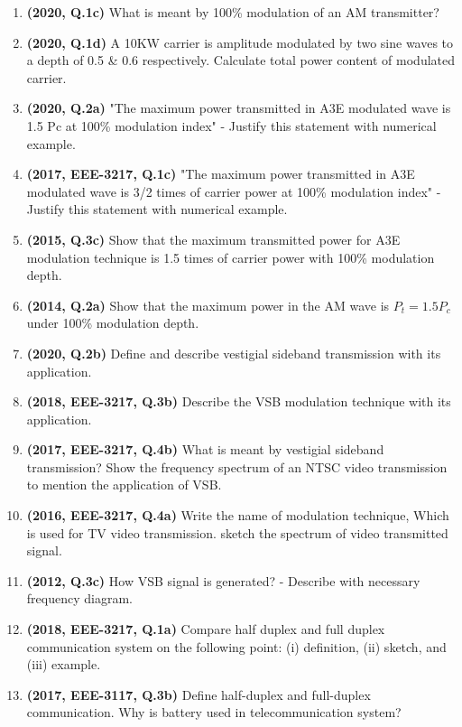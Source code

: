 \documentclass[12pt, a4paper]{article}
\begin{document}
\begin{enumerate}
		\item \textbf{(2020, Q.1c)} What is meant by 100\% modulation of an AM transmitter?
		
		\item \textbf{(2020, Q.1d)} A 10KW carrier is amplitude modulated by two sine waves to a depth of 0.5 \& 0.6 respectively. Calculate total power content of modulated carrier.
		
		\item \textbf{(2020, Q.2a)} "The maximum power transmitted in A3E modulated wave is 1.5 Pc at 100\% modulation index" - Justify this statement with numerical example.
		\item \textbf{(2017, EEE-3217, Q.1c)} "The maximum power transmitted in A3E modulated wave is 3/2 times of carrier power at 100\% modulation index" - Justify this statement with numerical example.
		\item \textbf{(2015, Q.3c)} Show that the maximum transmitted power for A3E modulation technique is 1.5 times of carrier power with 100\% modulation depth.
		\item \textbf{(2014, Q.2a)} Show that the maximum power in the AM wave is $P_t = 1.5 P_c$ under 100\% modulation depth.
		
		\item \textbf{(2020, Q.2b)} Define and describe vestigial sideband transmission with its application.
		\item \textbf{(2018, EEE-3217, Q.3b)} Describe the VSB modulation technique with its application.
		\item \textbf{(2017, EEE-3217, Q.4b)} What is meant by vestigial sideband transmission? Show the frequency spectrum of an NTSC video transmission to mention the application of VSB.
		\item \textbf{(2016, EEE-3217, Q.4a)} Write the name of modulation technique, Which is used for TV video transmission. sketch the spectrum of video transmitted signal.
		\item \textbf{(2012, Q.3c)} How VSB signal is generated? - Describe with necessary frequency diagram.
		
		\item \textbf{(2018, EEE-3217, Q.1a)} Compare half duplex and full duplex communication system on the following point: (i) definition, (ii) sketch, and (iii) example.
		\item \textbf{(2017, EEE-3117, Q.3b)} Define half-duplex and full-duplex communication. Why is battery used in telecommunication system?
		

\end{enumerate}
\end{document}
